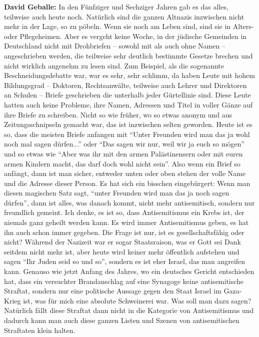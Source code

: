 \textbf{David Geballe:} In den Fünfziger und Sechziger Jahren gab es das alles, teilweise auch heute noch. Natürlich sind die ganzen Altnazis inzwischen nicht mehr in der Lage, so zu pöbeln. Wenn sie noch am Leben sind, sind sie in Alters- oder Pflegeheimen. Aber es vergeht keine Woche, in der jüdische Gemeinden in Deutschland nicht mit Drohbriefen – sowohl mit als auch ohne Namen – angeschrieben werden, die teilweise sehr deutlich bestimmte Gesetze brechen und nicht wirklich angenehm zu lesen sind. Zum Beispiel, als die sogenannte Beschneidungsdebatte war, war es sehr, sehr schlimm, da haben Leute mit hohem Bildungsgrad – Doktoren, Rechtsanwälte, teilweise auch Lehrer und Direktoren an Schulen – Briefe geschrieben die unterhalb jeder Gürtellinie sind. Diese Leute hatten auch keine Probleme, ihre Namen, Adressen und Titel in voller Gänze auf ihre Briefe zu schreiben. Nicht so wie früher, wo so etwas anonym und aus Zeitungsschnipseln gemacht war, das ist inzwischen selten geworden. Heute ist es so, dass die meisten Briefe anfangen mit "`Unter Freunden wird man das ja wohl noch mal sagen dürfen..."' oder "`Das sagen wir nur, weil wir ja euch so mögen"' und so etwas wie "`Aber was ihr mit den armen Palästinensern oder mit euren armen Kindern macht, das darf doch wohl nicht sein"'. Also wenn ein Brief so anfängt, dann ist man sicher, entweder unten oder oben stehen der volle Name und die Adresse dieser Person. Es hat sich ein bisschen eingebürgert: Wenn man diesen magischen Satz sagt, "`unter Freunden wird man das ja noch sagen dürfen"', dann ist alles, was danach kommt, nicht mehr antisemitisch, sondern nur freundlich gemeint. 
Ich denke, es ist so, dass Antisemitismus ein Krebs ist, der niemals ganz geheilt werden kann. Es wird immer Antisemitismus geben, es hat ihn auch schon immer gegeben. Die Frage ist nur, ist es gesellschaftsfähig oder nicht? Während der Nazizeit war er sogar Staatsraison, was er Gott sei Dank seitdem nicht mehr ist, aber heute wird keiner mehr öffentlich aufstehen und sagen "`Ihr Juden seid so und so"', sondern es ist eher Israel, das man angreifen kann. Genauso wie jetzt Anfang des Jahres, wo ein deutsches Gericht entschieden hat, dass ein versuchter Brandanschlag auf eine Synagoge keine antisemitische Straftat, sondern nur eine politische Aussage gegen den Staat Israel im Gaza-Krieg ist, was für mich eine absolute Schweinerei war. Was soll man dazu sagen? Natürlich fällt diese Straftat dann nicht in die Kategorie von Antisemitismus und dadurch kann man auch diese ganzen Listen und Szenen von antisemitischen Straftaten klein halten. 

